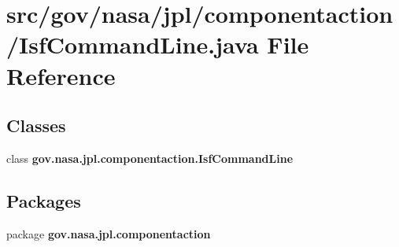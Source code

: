 \section{src/gov/nasa/jpl/componentaction/\+Isf\+Command\+Line.java File Reference}
\label{_isf_command_line_8java}
\subsection*{Classes}
\begin{DoxyCompactItemize}
\item 
class {\bf gov.\+nasa.\+jpl.\+componentaction.\+Isf\+Command\+Line}
\end{DoxyCompactItemize}
\subsection*{Packages}
\begin{DoxyCompactItemize}
\item 
package {\bf gov.\+nasa.\+jpl.\+componentaction}
\end{DoxyCompactItemize}
